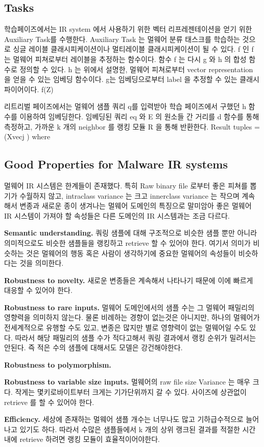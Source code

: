 \subsection{Tasks}

학습페이즈에서는 IR system 에서 사용하기 위한 벡터 리프레젠테이션을 얻기 위한 Auxiliary Task를 수행한다. Auxiliary Task 는 멀웨어 분류 태스크를 학습하는 것으로 싱글 레이블 클래시피케이션이나 멀티레이블 클래시피케이션이 될 수 있다. f 인 f 는 멀웨어 피쳐로부터 레이블을 추정하는 함수이다. 함수 f 는 다시 g 와 h 의 합성 함수로 정의할 수 있다. h 는 위에서 설명한, 멀웨어 피쳐로부터 vector representation 을 얻을 수 있는 임베딩 함수이다. g는 임베딩으로부터 label 을 추정할 수 있는 클래시파이어이다.  
f(Z)

리트리벌 페이즈에서는 멀웨어 샘플 쿼리 q를 입력받아 학습 페이즈에서 구했던 h 함수를 이용하여 임베딩한다. 임베딩된 쿼리 eq 와 E 의 원소들 간 거리를 d 함수를 통해 측정하고, 가까운 k 개의 neighbor 를 랭킹 모듈 R 을 통해 반환한다. 
Result tuples = (Xvecj ) where


\subsection{Good Properties for Malware IR systems}
멀웨어 IR 시스템은 한계들이 존재했다. 특히 Raw binary file 로부터 좋은 피쳐를 뽑기가 수월하지 않고, intraclass variance 는 크고 innerclass variance 는 작으며 계속해서 변종과 새로운 종이 생겨나는 멀웨어 도메인의 특징으로 말미암아 좋은 멀웨어 IR 시스템이 가져야 할 속성들은 다른 도메인의 IR 시스템과는 조금 다르다.

\textbf{Semantic understanding. }
쿼링 샘플에 대해 구조적으로 비슷한 샘플 뿐만 아니라 의미적으로도 비슷한 샘플들을 랭킹하고 retrieve 할 수 있어야 한다. 여기서 의미가 비슷하는 것은 멀웨어의 행동 혹은 사람이 생각하기에 중요한 멀웨어의 속성들이 비슷하다는 것을 의미한다. 


\textbf{Robustness to novelty. }
새로운 변종들은 계속해서 나타나기 때문에 이에 빠르게 대응할 수 있어야 한다. 


\textbf{Robustness to rare inputs. }
멀웨어 도메인에서의 샘플 수는 그 멀웨어 패밀리의 영향력을 의미하지 않는다. 물론 비례하는 경향이 없는것은 아니지만, 하나의 멀웨어가 전세계적으로 유행할 수도 있고, 변종은 많지만 별로 영향력이 없는 멀웨어일 수도 있다. 따라서 해당 패밀리의 샘플 수가 적다고해서 쿼링 결과에서 랭킹 순위가 밀려서는 안된다. 즉 적은 수의 샘플에 대해서도 모델은 강건해야한다. 


\textbf{Robustness to polymorphism. }


\textbf{Robustness to variable size inputs. }
멀웨어의 raw file size Variance 는 매우 크다. 작게는 몇키로바이트부터 크게는 기가단위까지 갈 수 있다. 사이즈에 상관없이 retrieve 를 할 수 있어야 한다.

\textbf{Efficiency. }
세상에 존재하는 멀웨어 샘플 개수는 너무나도 많고 기하급수적으로 늘어나고 있기도 하다. 따라서 수많은 샘플들에서 k 개의 상위 랭크된 결과를 적절한 시간 내에 retrieve 하려면 랭킹 모듈이 효율적이어야한다.

